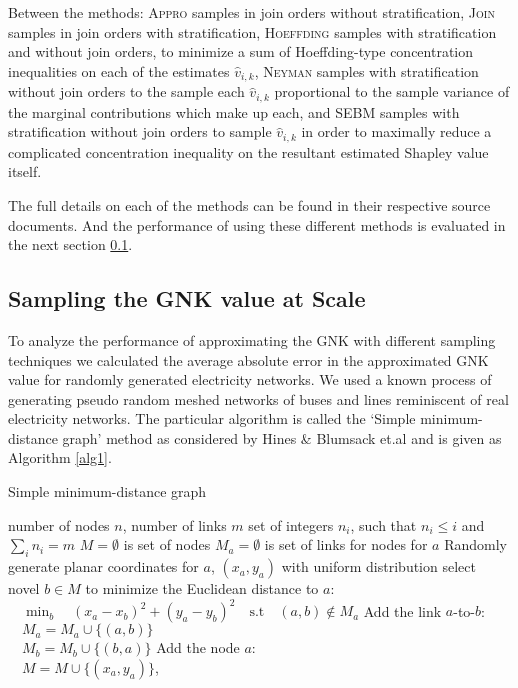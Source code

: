 Between the methods: \textsc{Appro} samples in join orders without stratification, \textsc{Join} samples in join orders with stratification, \textsc{Hoeffding} samples with stratification and without join orders, to minimize a sum of Hoeffding-type concentration inequalities on each of the estimates $\hat{v}_{i,k}$,
\textsc{Neyman} samples with stratification without join orders to the sample each $\hat{v}_{i,k}$ proportional to the sample variance of the marginal contributions which make up each,
and \textsc{SEBM} samples with stratification without join orders to sample $\hat{v}_{i,k}$ in order to maximally reduce a complicated concentration inequality on the resultant estimated Shapley value itself.

The full details on each of the methods can be found in their respective source documents.\cite{CASTRO2017180,2013arXiv1306.4265M,burgess2,DBLP:journals/cor/CastroGT09}
And the performance of using these different methods is evaluated in the next section \ref{section:performance}.

\subsection{Sampling the GNK value at Scale}\label{section:performance}

To analyze the performance of approximating the GNK with different sampling techniques we calculated the average absolute error in the approximated GNK value for randomly generated electricity networks.
We used a known process of generating pseudo random meshed networks of buses and lines reminiscent of real electricity networks. The particular algorithm is called the `Simple minimum-distance graph' method as considered by Hines \& Blumsack et.al \cite{hines1} and is given as Algorithm \ref{alg1}.

\begin{algorithm}[]
\caption{Simple minimum-distance graph}
\label{alg1}
\begin{algorithmic}
    \REQUIRE number of nodes $n$, number of links $m$
    \REQUIRE set of integers $n_i$, such that $n_i\leq i$ and $\sum_in_i=m$
    \STATE $M=\emptyset$ is set of nodes
    \STATE $M_a=\emptyset$ is set of links for nodes for $a$
        \STATE Randomly generate planar coordinates for $a$, $(x_a ,y_a)$ with uniform distribution
            \STATE select novel $b\in M$ to minimize the Euclidean distance to $a$:\\ $\quad\min_b\quad (x_a-x_b)^2+(y_a-y_b)^2\quad\text{s.t}\quad (a, b)\notin M_a$
            \STATE Add the link $a$-to-$b$:\\ $\quad M_a=M_a\cup \{(a, b)\}$\\ $\quad M_b=M_b\cup \{(b, a)\}$
        \ENDFOR
        \STATE Add the node $a$:\\ $\quad M=M\cup \{(x_a ,y_a)\}$, 
    \ENDFOR
\end{algorithmic}
\end{algorithm}

